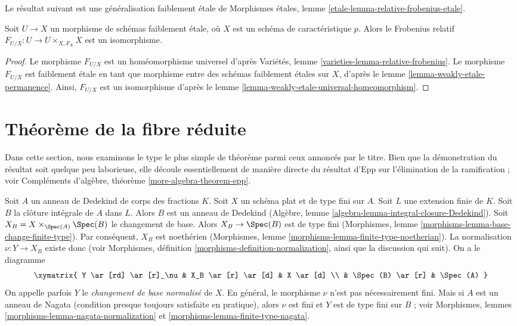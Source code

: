\noindent
Le résultat suivant est une généralisation faiblement \'etale de
Morphismes \'etales, lemme \ref{etale-lemma-relative-frobenius-etale}.

\begin{lemma}
\label{lemma-relative-frobenius-weakly-etale}
Soit $U \to X$ un morphisme de schémas faiblement \'etale, où $X$ est un schéma
de caractéristique $p$. Alors le Frobenius relatif
$F_{U/X} : U \to U \times_{X, F_X} X$ est un isomorphisme.
\end{lemma}

\begin{proof}
Le morphisme $F_{U/X}$ est un homéomorphisme universel d'après
Variétés, lemme \ref{varieties-lemma-relative-frobenius}.
Le morphisme $F_{U/X}$ est faiblement \'etale en tant que morphisme
entre des schémas faiblement \'etales sur $X$, d'après le
lemme \ref{lemma-weakly-etale-permanence}. Ainsi, $F_{U/X}$
est un isomorphisme d'après le lemme \ref{lemma-weakly-etale-universal-homeomorphism}.
\end{proof}






\section{Théorème de la fibre réduite}
\label{section-reduced-fibre-theorem}

\noindent
Dans cette section, nous examinons le type le plus simple de théorème parmi ceux
annoncés par le titre. Bien que la démonstration du résultat soit quelque peu
laborieuse, elle découle essentiellement de manière directe du
résultat d'Epp sur l'élimination de la ramification ; voir
Compléments d'algèbre, théorème \ref{more-algebra-theorem-epp}.

\medskip\noindent
Soit $A$ un anneau de Dedekind de corps des fractions $K$.
Soit $X$ un schéma plat et de type fini sur $A$.
Soit $L$ une extension finie de $K$. Soit $B$ la clôture intégrale
de $A$ dans $L$. Alors $B$ est un anneau de Dedekind
(Algèbre, lemme \ref{algebra-lemma-integral-closure-Dedekind}).
Soit $X_B = X \times_{\Spec(A)} \Spec(B)$ le changement de base.
Alors $X_B \to \Spec(B)$ est de type fini
(Morphismes, lemme \ref{morphisms-lemma-base-change-finite-type}).
Par conséquent, $X_B$ est noethérien
(Morphismes, lemme \ref{morphisms-lemma-finite-type-noetherian}).
La normalisation $\nu : Y \to X_B$ existe donc (voir
Morphismes, définition \ref{morphisms-definition-normalization},
ainsi que la discussion qui suit). On a le diagramme
\begin{equation}
\label{equation-normalized-base-change}
\xymatrix{
Y \ar[rd] \ar[r]_\nu & X_B \ar[r] \ar[d] & X \ar[d] \\
 & \Spec(B) \ar[r] & \Spec(A)
}
\end{equation}
On appelle parfois $Y$ le {\it changement de base normalisé} de $X$.
En général, le morphisme $\nu$ n'est pas nécessairement fini. Mais si $A$ est
un anneau de Nagata (condition presque toujours satisfaite en
pratique), alors $\nu$ est fini et $Y$ est de type fini sur $B$ ; voir
Morphismes, lemmes \ref{morphisms-lemma-nagata-normalization} et
\ref{morphisms-lemma-finite-type-nagata}.

